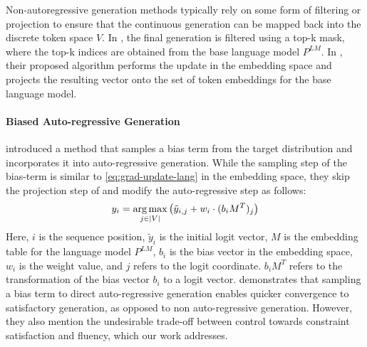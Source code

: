 Non-autoregressive generation methods typically rely on some form of filtering or projection to ensure that the continuous generation can be mapped back into the discrete token space $V$. In \citet{qin2022cold}, the final generation is filtered using a top-k mask, where the top-k indices are obtained from the base language model $P^{LM}$. In \citet{kumar2022gradient}, their proposed algorithm performs the update in the embedding space and projects the resulting vector onto the set of token embeddings for the base language model.

\paragraph{Biased Auto-regressive Generation}
\citet{liu2023bolt} introduced a method that samples a bias term from the target distribution and incorporates it into auto-regressive generation. While the sampling step of the bias-term is similar to \eqref{eq:grad-update-lang} in the embedding space, they skip the projection step of \citet{kumar2022gradient} and modify the auto-regressive step as follows: 
\begin{align}
    y_i = \operatorname*{arg\,max}_{j \in |V|} \left( \tilde{y}_{i, j} + w_i \cdot (b_{i}M^T)_j \right) 
    \label{eq:bolt-auto-reg}
\end{align}
Here, $i$ is the sequence position, $\tilde{y}_i$ is the initial logit vector, $M$ is the embedding table for the language model $P^{LM}$, $b_i$ is the bias vector in the embedding space, $w_i$ is the weight value, and $j$ refers to the logit coordinate.
$b_i M^T$ refers to the transformation of the bias vector $b_i$ to a logit vector. 
\citet{liu2023bolt} demonstrates that sampling a bias term to direct auto-regressive generation enables quicker convergence to satisfactory generation, as opposed to non auto-regressive generation. 
However, they also mention the undesirable trade-off between control towards constraint satisfaction and fluency, which our work addresses. 